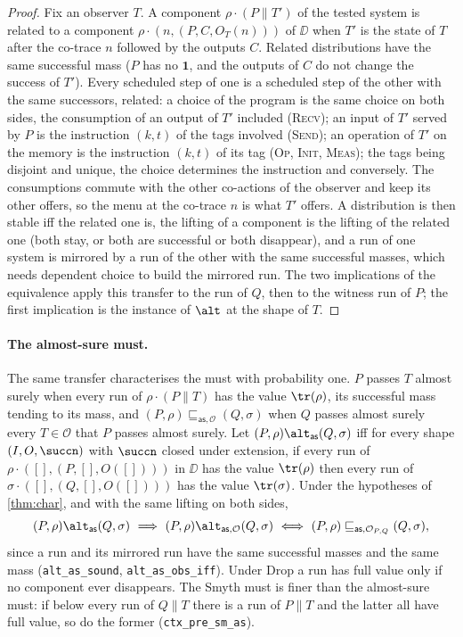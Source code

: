 \begin{proof}
Fix an observer $T$. A component $\rho \cdot (P \parallel T')$ of the tested
system is related to a component $\rho \cdot (n,(P,C,O_T(n)))$ of $\DD$
when $T'$ is the state of $T$ after the co-trace $n$ followed by the
outputs $C$. Related distributions have the same successful mass ($P$ has
no $\mathbf{1}$, and the outputs of $C$ do not change the success of $T'$).
Every scheduled step of one is a scheduled step of the other with the
same successors, related: a choice of the program is the same choice on
both sides, the consumption of an output of $T'$ included (\textsc{Recv});
an input of $T'$ served by $P$ is the instruction $(k,t)$ of the tags
involved (\textsc{Send}); an operation of $T'$ on the memory is the
instruction $(k,t)$ of its tag (\textsc{Op}, \textsc{Init}, \textsc{Meas});
the tags being disjoint and unique, the choice determines the instruction
and conversely. The
consumptions commute with the other co-actions of the observer and keep its
other offers, so the menu at the co-trace $n$ is what $T'$ offers. A
distribution is then stable iff the related one is, the lifting of a
component is the lifting of the related one (both stay, or both are
successful or both disappear), and a run of one system is mirrored by a run
of the other with the same successful masses, which needs dependent choice
to build the mirrored run. The two implications of
the equivalence apply this transfer to the run of $Q$, then to the witness
run of $P$; the first implication is the instance of $\alt$ at the shape of
$T$.
\end{proof}

\paragraph{The almost-sure must.} The same transfer characterises the
must with probability one. $P$ passes $T$ almost surely when every run of
$\rho \cdot (P \parallel T)$ has the value $\tr(\rho)$, its successful mass
tending to its mass, and $(P,\rho) \sqsubseteq_{\mathsf{as}, \mathcal{O}}
(Q,\sigma)$ when $Q$ passes almost surely every $T \in \mathcal{O}$ that
$P$ passes almost surely. Let $(P,\rho) \alt_{\mathsf{as}} (Q,\sigma)$ iff
for every shape $(I, O, \succn)$ with $\succn$ closed under extension, if
every run of $\rho \cdot ([],(P,[],O([])))$ in $\DD$ has the value
$\tr(\rho)$ then every run of $\sigma \cdot ([],(Q,[],O([])))$ has the value
$\tr(\sigma)$. Under the hypotheses of \cref{thm:char}, and with the same
lifting on both sides,
\[
(P,\rho) \alt_{\mathsf{as}} (Q,\sigma)
\ \Longrightarrow\
(P,\rho) \alt_{\mathsf{as}, \mathcal{O}} (Q,\sigma)
\ \Longleftrightarrow\
(P,\rho) \sqsubseteq_{\mathsf{as}, \mathcal{O}_{P,Q}} (Q,\sigma),
\]
since a run and its mirrored run have the same successful masses and the
same mass (\texttt{alt\_as\_sound}, \texttt{alt\_as\_obs\_iff}). Under Drop
a run has full value only if no component ever disappears. The Smyth must
is finer than the almost-sure must: if below every run of $Q \parallel T$
there is a run of $P \parallel T$ and the latter all have full value, so
do the former (\texttt{ctx\_pre\_sm\_as}).


